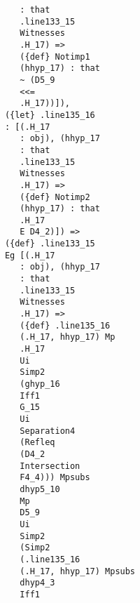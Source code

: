 \documentclass[12pt]{article}
\begin{document}
\begin{verbatim}
                                        : that 
                                        .line133_15 
                                        Witnesses 
                                        .H_17) => 
                                        ({def} Notimp1 
                                        (hhyp_17) : that 
                                        ~ (D5_9 
                                        <<= 
                                        .H_17))]), 
                                     ({let} .line135_16 
                                     : [(.H_17 
                                        : obj), (hhyp_17 
                                        : that 
                                        .line133_15 
                                        Witnesses 
                                        .H_17) => 
                                        ({def} Notimp2 
                                        (hhyp_17) : that 
                                        .H_17 
                                        E D4_2)]) => 
                                     ({def} .line133_15 
                                     Eg [(.H_17 
                                        : obj), (hhyp_17 
                                        : that 
                                        .line133_15 
                                        Witnesses 
                                        .H_17) => 
                                        ({def} .line135_16 
                                        (.H_17, hhyp_17) Mp 
                                        .H_17 
                                        Ui 
                                        Simp2 
                                        (ghyp_16 
                                        Iff1 
                                        G_15 
                                        Ui 
                                        Separation4 
                                        (Refleq 
                                        (D4_2 
                                        Intersection 
                                        F4_4))) Mpsubs 
                                        dhyp5_10 
                                        Mp 
                                        D5_9 
                                        Ui 
                                        Simp2 
                                        (Simp2 
                                        (.line135_16 
                                        (.H_17, hhyp_17) Mpsubs 
                                        dhyp4_3 
                                        Iff1 

\end{verbatim}
\end{document}
